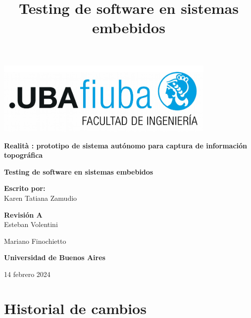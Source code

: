 \documentclass[12pt,a4paper, twoside]{article} %
\date{}
\title{Testing de software en sistemas embebidos}
\begin{document}
\renewcommand\refname{}
\renewcommand{\contentsname}{Tabla de contenido}
\newpage

\begin{titlepage}
    \begin{center}
        \vspace*{1cm}
        
                \includegraphics[width=0.8\textwidth]{Figuras/logoFIUBA.pdf} %
        
        \vspace{1.5cm}
        
        \textbf{\LARGE Realità : prototipo de sistema autónomo para captura de información topográfica}
        
        \vspace{4cm}
        \textbf{\Large Testing de software en sistemas embebidos}
        
        \vspace{1.5cm}
        
        
        \textbf{\Large Escrito por:}\\
        \large Karen Tatiana Zamudio
        
        \vspace{0.8cm}
        
        \textbf{\Large Revisión A}\\
        \large Esteban Volentini
        
        \large Mariano Finochietto
        
        \vfill
        
        \textbf{\Large Universidad de Buenos Aires}\\ 
        \vspace{0.2cm}
        
        \large 14 febrero 2024
        
    \end{center}
\end{titlepage}
\newpage

\section*{Historial de cambios}
\label{sec:registro}
\end{document}
